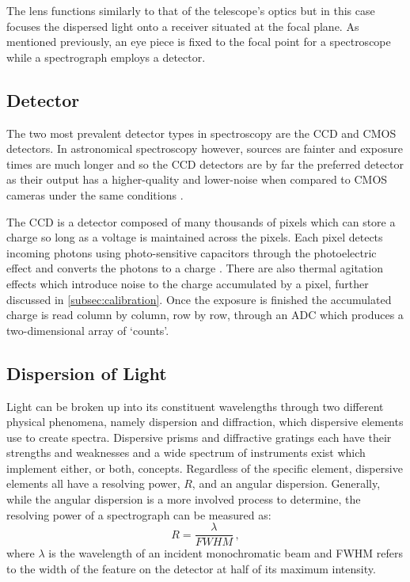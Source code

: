 The lens functions similarly to that of the telescope's optics but in this case focuses the dispersed light onto a receiver situated at the focal plane. As mentioned previously, an eye piece is fixed to the focal point for a spectroscope while a spectrograph employs a detector.

\subsection{Detector}

The two most prevalent detector types in spectroscopy are the \gls{CCD} and \gls{CMOS} detectors. In astronomical spectroscopy however, sources are fainter and exposure times are much longer and so the \gls{CCD} detectors are by far the preferred detector as their output has a higher-quality and lower-noise when compared to \gls{CMOS} cameras under the same conditions \citep{CCDvsCMOS}.

The \gls{CCD} is a detector composed of many thousands of pixels which can store a charge so long as a voltage is maintained across the pixels. Each pixel detects incoming photons using photo-sensitive capacitors through the photoelectric effect and converts the photons to a charge \citep{CCDastronomy}. There are also thermal agitation effects which introduce noise to the charge accumulated by a pixel, further discussed in \autoref{subsec:calibration}. Once the exposure is finished the accumulated charge is read column by column, row by row, through an \gls{ADC}  which produces a two-dimensional array of `counts'.


\subsection{Dispersion of Light} \label{subsec:dispersion}

Light can be broken up into its constituent wavelengths through two different physical phenomena, namely dispersion and diffraction, which dispersive elements use to create spectra. Dispersive prisms and diffractive gratings each have their strengths and weaknesses and a wide spectrum of instruments exist which implement either, or both, concepts. Regardless of the specific element, dispersive elements all have a resolving power, $R$, and an angular dispersion. Generally, while the angular dispersion is a more involved process to determine, the resolving power of a spectrograph can be measured as:
\begin{equation}
    R = \frac{\lambda}{FWHM}\,,\label{eq:resolving_power}
\end{equation}
where $\lambda$ is the wavelength of an incident monochromatic beam and \gls{FWHM} refers to the width of the feature on the detector at half of its maximum intensity.

